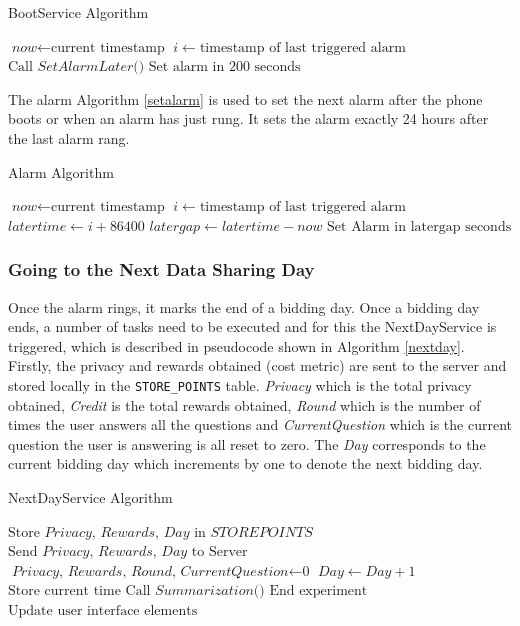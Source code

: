 \begin{algorithm}
\caption{BootService Algorithm}\label{boot}
\begin{algorithmic}[1]
\State $\textit{now} \gets \text{current timestamp}$
\State $i \gets \text{timestamp of last triggered alarm}$
  \State $\text{Call }\textit{SetAlarmLater()}$
\Else
  \State $\text{Set alarm in 200 seconds}$
\EndIf
\EndProcedure
\end{algorithmic}
\end{algorithm}

The alarm Algorithm \ref{setalarm} is used to set the next alarm after the phone boots or when an alarm has just rung. It sets the alarm exactly 24 hours after the last alarm rang.

\begin{algorithm}
\caption{Alarm Algorithm}\label{setalarm}
\begin{algorithmic}[1]
\State $\textit{now} \gets \text{current timestamp}$
\State $i \gets \text{timestamp of last triggered alarm}$
\State $\textit{latertime} \gets \textit{i}+\text{86400}$
\State $\textit{latergap} \gets \textit{latertime}-\textit{now}$
\State $\text{Set Alarm in latergap seconds}$
\EndProcedure
\end{algorithmic}
\end{algorithm}

\subsubsection{Going to the Next Data Sharing Day} \label{next}
Once the alarm rings, it marks the end of a bidding day. Once a bidding day ends, a number of tasks need to be executed
and for this the NextDayService is triggered, which is described in pseudocode shown in Algorithm \ref{nextday}. Firstly, the privacy and rewards obtained (cost metric) are sent to the server and stored locally in the \texttt{STORE\_POINTS} table. \textit{Privacy} which is the total privacy obtained, \textit{Credit} is the total rewards obtained, \textit{Round} which is the number of times the user answers all the questions and \textit{CurrentQuestion} which is the current question the user is answering is all reset to zero. The \textit{Day} corresponds to the current bidding day which increments by one to denote the next bidding day.

\begin{algorithm}
\caption{NextDayService Algorithm}\label{nextday}
\begin{algorithmic}[1]
\State $\text{Store }\textit{Privacy, Rewards, Day } \text{in } \textit{STOREPOINTS}$
\State $\text{Send }\textit{Privacy, Rewards, Day } \text{to Server}$
\State $\textit{Privacy, Rewards, Round, CurrentQuestion} \gets \text{0}$
\State $\textit{Day} \gets \textit{Day}+1$
\State $\text{Store current time}$
\State $\text{Call }\textit{Summarization()}$
  \State $\text{End experiment}$
\Else
  \State $\text{Update user interface elements}$ 
\EndIf
\EndProcedure
\end{algorithmic}
\end{algorithm}

